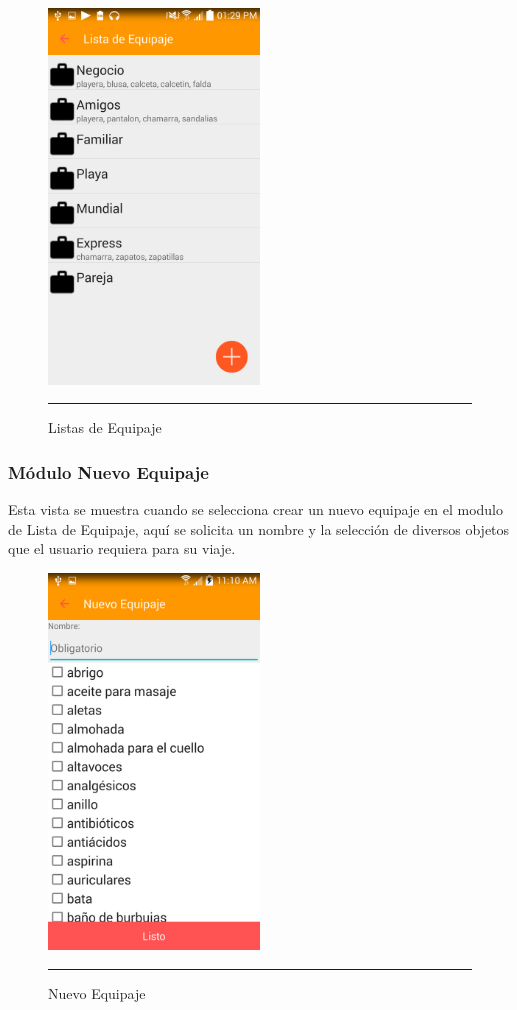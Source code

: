 \begin{figure}[h]
	\centering
		\includegraphics[width=0.5\textwidth]{Figuras/equipaje.png}
		\rule{30em}{0.5pt}
	\caption[Listas de Equipaje]{Listas de Equipaje}
	\label{fig:equipaje}
\end{figure}
\clearpage

\subsubsection{Módulo Nuevo Equipaje}
Esta vista se muestra cuando se selecciona crear un nuevo equipaje en el modulo de Lista de Equipaje, 
aquí se solicita un nombre y la selección de diversos objetos que el usuario requiera para su viaje.

\begin{figure}[h]
	\centering
		\includegraphics[width=0.5\textwidth]{Figuras/nuevoequipaje.png}
		\rule{30em}{0.5pt}
	\caption[Nuevo Equipaje]{Nuevo Equipaje}
	\label{fig:nuevoEquipaje}
\end{figure}
\clearpage

